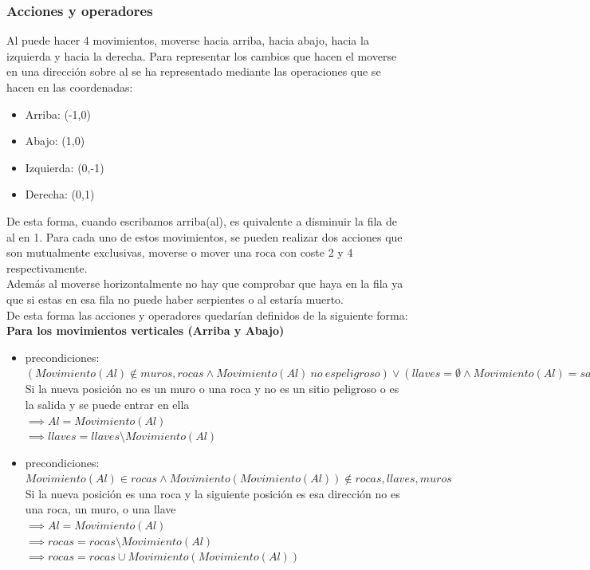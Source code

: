 \documentclass[11pt,spanish]{article}
\begin{document}
			\subsubsection{Acciones y operadores}
			Al puede hacer 4 movimientos, moverse hacia arriba, hacia abajo, hacia la izquierda y hacia la derecha. Para representar los cambios que hacen el moverse en una dirección sobre al se ha representado mediante las operaciones que se hacen en las coordenadas:
			\begin{itemize}
				\item Arriba: (-1,0)
				\item Abajo: (1,0)
				\item Izquierda: (0,-1)
				\item Derecha: (0,1)
			\end{itemize}
			De esta forma, cuando escribamos arriba(al), es quivalente a disminuir la fila de al en 1.
			Para cada uno de estos movimientos, se pueden realizar dos acciones que son mutualmente exclusivas, moverse o mover una roca con coste 2 y 4 respectivamente.\\
			Además al moverse horizontalmente no hay que comprobar que haya en la fila ya que si estas en esa fila no puede haber serpientes o al estaría muerto.\\
			De esta forma las acciones y operadores quedarían definidos de la siguiente forma:\\
			\textbf{Para los movimientos verticales (Arriba y Abajo)}
			\begin{itemize}
				\item precondiciones: $(Movimiento(Al) \notin muros, rocas \land Movimiento(Al)\ no\ es peligroso) \lor (llaves = \emptyset \land Movimiento(Al) = salida)$\\Si la nueva posición no es un muro o una roca y no es un sitio peligroso o es la salida y se puede entrar en ella\\
				$\implies Al = Movimiento(Al)$\\
				$\implies llaves = llaves\setminus Movimiento(Al)$
				\item precondiciones: $Movimiento(Al) \in rocas \land Movimiento(Movimiento(Al)) \notin rocas, llaves, muros$\\Si la nueva posición es una roca y la siguiente posición es esa dirección no es una roca, un muro, o una llave\\
				$\implies Al = Movimiento(Al)$\\
				$\implies rocas = rocas\setminus Movimiento(Al)$\\
				$\implies rocas = rocas \cup Movimiento(Movimiento(Al))$
			\end{itemize}
\end{document}

